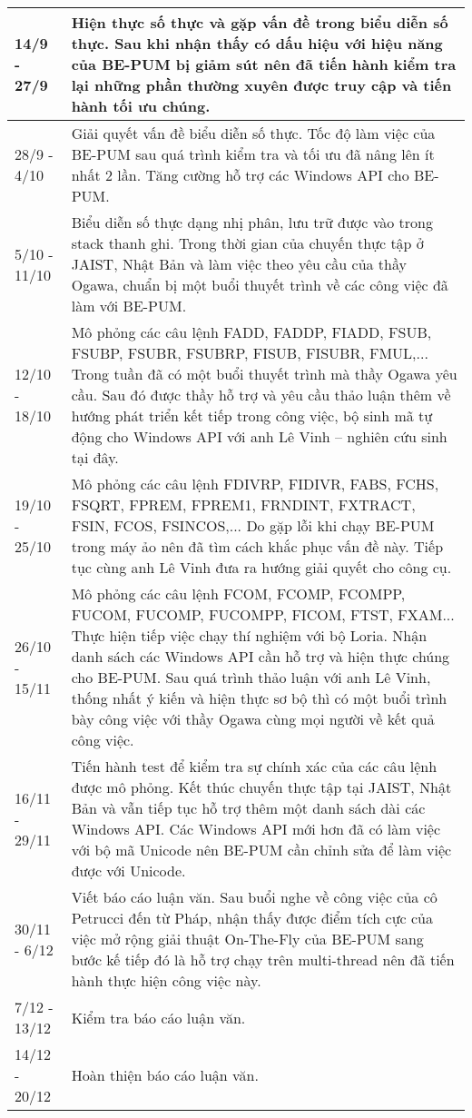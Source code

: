 \begin{longtable}{|l|m{13cm}|}
		\hline	
			14/9 - 27/9	& Hiện thực số thực và gặp vấn đề trong biểu diễn số thực. Sau khi nhận thấy có dấu hiệu với hiệu năng của BE-PUM bị giảm sút nên đã tiến hành kiểm tra lại những phần thường xuyên được truy cập và tiến hành tối ưu chúng.\\
		\hline	
			28/9 - 4/10&	Giải quyết vấn đề biểu diễn số thực. Tốc độ làm việc của BE-PUM sau quá trình kiểm tra và tối ưu đã nâng lên ít nhất 2 lần. Tăng cường hỗ trợ các Windows API cho BE-PUM.\\
		\hline	
			5/10 - 11/10&	Biểu diễn số thực dạng nhị phân, lưu trữ được vào trong stack thanh ghi. Trong thời gian của chuyến thực tập ở JAIST, Nhật Bản và làm việc theo yêu cầu của thầy Ogawa, chuẩn bị một buổi thuyết trình về các công việc đã làm với BE-PUM.\\
		\hline	
			12/10 - 18/10&	Mô phỏng các câu lệnh FADD, FADDP, FIADD, FSUB, FSUBP, FSUBR, FSUBRP, FISUB, FISUBR, FMUL,... Trong tuần đã có một buổi thuyết trình mà thầy Ogawa yêu cầu. Sau đó được thầy hỗ trợ và yêu cầu thảo luận thêm về hướng phát triển kết tiếp trong công việc, bộ sinh mã tự động cho Windows API với anh Lê Vinh -- nghiên cứu sinh tại đây.\\
		\hline	
			19/10 - 25/10&	Mô phỏng các câu lệnh  FDIVRP, FIDIVR, FABS, FCHS, FSQRT, FPREM, FPREM1, FRNDINT, FXTRACT, FSIN, FCOS, FSINCOS,... Do gặp lỗi khi chạy BE-PUM trong máy ảo nên đã tìm cách khắc phục vấn đề này. Tiếp tục cùng anh Lê Vinh đưa ra hướng giải quyết cho công cụ.\\
		\hline
			26/10 - 15/11	& Mô phỏng các câu lệnh FCOM, FCOMP, FCOMPP, FUCOM, FUCOMP, FUCOMPP, FICOM,  FTST, FXAM... Thực hiện tiếp việc chạy thí nghiệm với bộ Loria. Nhận danh sách các Windows API cần hỗ trợ và hiện thực chúng cho BE-PUM. Sau quá trình thảo luận với anh Lê Vinh, thống nhất ý kiến và hiện thực sơ bộ thì có một buổi trình bày công việc với thầy Ogawa cùng mọi người về kết quả công việc.\\		
		\hline	
			16/11 - 29/11&	Tiến hành test để kiểm tra sự chính xác của các câu lệnh được mô phỏng. Kết thúc chuyến thực tập tại JAIST, Nhật Bản và vẫn tiếp tục hỗ trợ thêm một danh sách dài các Windows API. Các Windows API mới hơn đã có làm việc với bộ mã Unicode nên BE-PUM cần chỉnh sửa để làm việc được với Unicode.\\
		\hline	
			30/11 - 6/12	& Viết báo cáo luận văn. Sau buổi nghe về công việc của cô Petrucci đến từ Pháp, nhận thấy được điểm tích cực của việc mở rộng giải thuật On-The-Fly của BE-PUM sang bước kế tiếp đó là hỗ trợ chạy trên multi-thread nên đã tiến hành thực hiện công việc này.\\
		\hline	
			7/12 - 13/12	& Kiểm tra báo cáo luận văn.\\
		\hline	
			14/12 - 20/12&	Hoàn thiện báo cáo luận văn.\\
		\hline
	\end{longtable}